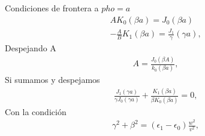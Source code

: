 Condiciones de frontera a $pho=a$
\begin{eqnarray}
AK_{0}(\beta a) = J_{0}(\beta a)\\
-\frac{A}{B}K_{1}(\beta a) = \frac{J_{1}}{\gamma}(\gamma a),
\end{eqnarray}
Despejando A
\begin{eqnarray}
 A= \frac{J_{0}(\beta A)}{k_{0}(\beta a)},
\end{eqnarray}
Si sumamos y despejamos
\begin{eqnarray}
	\frac{J_{1}(\gamma a)}{\gamma J_{0}(\gamma a)}+\frac{K_{1}(\beta a)}{\beta K_{0}(\beta a)} = 0,
	\end{eqnarray}
Con la condición
\begin{eqnarray}
	\gamma^2+\beta^2=(\epsilon_{1}-\epsilon_{0})\frac{w^2}{v^2},
\end{eqnarray}
